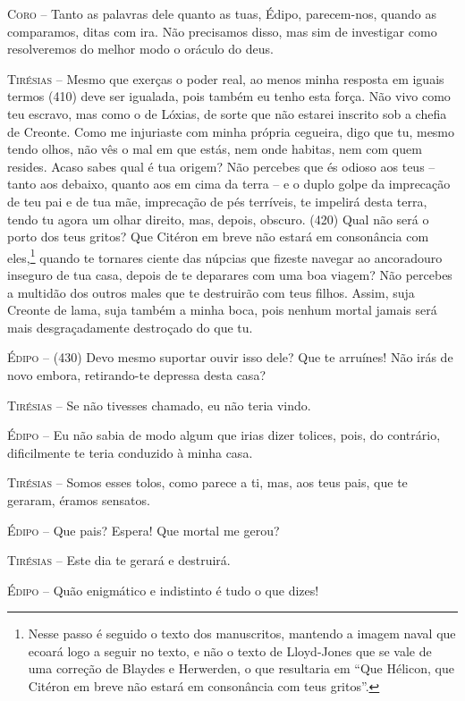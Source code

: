 \textsc{Coro} --   Tanto as palavras dele quanto as tuas, Édipo, parecem-nos, quando as
comparamos, ditas com ira. Não precisamos disso, mas sim de investigar
como resolveremos do melhor modo o oráculo do deus.

\textsc{Tirésias} --   Mesmo que exerças o poder real, ao menos minha resposta em iguais termos
(410) deve ser igualada, pois também eu tenho esta força. Não vivo como
teu escravo, mas como o de Lóxias, de sorte que não estarei inscrito sob
a chefia de Creonte. Como me injuriaste com minha própria cegueira, digo
que tu, mesmo tendo olhos, não vês o mal em que estás, nem onde habitas,
nem com quem resides. Acaso sabes qual é tua origem? Não percebes que és
odioso aos teus -- tanto aos debaixo, quanto aos em cima da terra -- e o
duplo golpe da imprecação de teu pai e de tua mãe, imprecação de pés
terríveis, te impelirá desta terra, tendo tu agora um olhar direito,
mas, depois, obscuro. (420) Qual não será o porto dos teus gritos? Que
Citéron em breve não estará em consonância com eles,\footnote{Nesse passo
  é seguido o texto dos manuscritos, mantendo a imagem naval que ecoará
  logo a seguir no texto, e não o texto de Lloyd-Jones que se vale de
  uma correção de Blaydes e Herwerden, o que resultaria em ``Que
  Hélicon, que Citéron em breve não estará em consonância com teus
  gritos''.} quando te tornares ciente das núpcias que fizeste navegar
ao ancoradouro inseguro de tua casa, depois de te deparares com uma boa
viagem? Não percebes a multidão dos outros males que te destruirão com
teus filhos. Assim, suja Creonte de lama, suja também a minha boca, pois
nenhum mortal jamais será mais desgraçadamente destroçado do que tu.

\textsc{Édipo} --   (430) Devo mesmo suportar ouvir isso dele? Que te arruínes! Não irás de
novo embora, retirando-te depressa desta casa?

\textsc{Tirésias} --   Se não tivesses chamado, eu não teria vindo.

\textsc{Édipo} --   Eu não sabia de modo algum que irias dizer tolices, pois, do contrário,
dificilmente te teria conduzido à minha casa.

\textsc{Tirésias} --   Somos esses tolos, como parece a ti, mas, aos teus pais, que te geraram,
éramos sensatos.

\textsc{Édipo} --   Que pais? Espera! Que mortal me gerou?

\textsc{Tirésias} --   Este dia te gerará e destruirá.

\textsc{Édipo} --   Quão enigmático e indistinto é tudo o que dizes!

